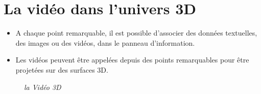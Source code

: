 \section{La vidéo dans l'univers 3D}
\begin{itemize}
\item A chaque point remarquable, il est possible d'associer des données textuelles, des images ou des vidéos,
dans le panneau d'information.
\item Les vidéos peuvent être appelées depuis des points remarquables pour être projetées sur des surfaces 3D.
\end{itemize}
\begin{center}
\begin{figure}[ht]
\caption{\label{equiProj}\textit{la Vidéo 3D}}
\end{figure}
\end{center}
\newpage
